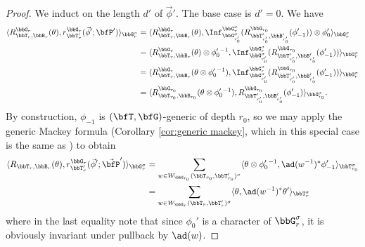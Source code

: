 \begin{proof}
  We induct on the length $d'$ of $\vec \phi'$. The base case is $d' = 0$. We have
  \begin{align*}
    \langle R_{\bbT_r,\bbB_r}^{\bbG_r}(\theta), r_{\bbT_r'}^{\bbG_r}(\vec \phi'; \bfP') \rangle_{\bbG_r^\sigma} 
    &= \langle R_{\bbT_r,\bbB_r}^{\bbG_r}(\theta), \Inf_{\bbG_{r_0'}^\sigma}^{\bbG_r^\sigma}(R_{\bbT_{r_0'}',\bbB_{r_0'}'}^{\bbG_{r_0}}(\phi_{-1}')) \otimes \phi_0' \rangle_{\bbG_r^\sigma} \\
    &= \langle R_{\bbT_r,\bbB_r}^{\bbG_r}(\theta) \otimes \phi_0'{}^{-1}, \Inf_{\bbG_{r_0'}^\sigma}^{\bbG_r^\sigma}(R_{\bbT_{r_0'}',\bbB_{r_0'}'}^{\bbG_{r_0}}(\phi_{-1}')) \rangle_{\bbG_r^\sigma} \\
    &= \langle R_{\bbT_r,\bbB_r}^{\bbG_r}(\theta \otimes \phi_0'{}^{-1}), \Inf_{\bbG_{r_0'}^\sigma}^{\bbG_r^\sigma}(R_{\bbT_{r_0'}',\bbB_{r_0'}'}^{\bbG_{r_0}}(\phi_{-1}')) \rangle_{\bbG_r^\sigma} \\
    &= \langle R_{\bbT_{r_0},\bbB_{r_0}}^{\bbG_{r_0}}(\theta \otimes \phi_0'{}^{-1}), R_{\bbT_{r_0'}',\bbB_{r_0'}'}^{\bbG_{r_0}}(\phi_{-1}') \rangle_{\bbG_{r_0}^\sigma}.
  \end{align*}
  By construction, $\phi_{-1}$ is $(\bfT,\bfG)$-generic of depth $r_0$, so we may apply the generic Mackey formula (Corollary \ref{cor:generic mackey}, which in this special case is the same as \cite[Theorem 1.1]{CI21-RT}) to obtain
  \begin{align*}
    \langle R_{\bbT_r,\bbB_r}(\theta), r_{\bbT_r'}^{\bbG_r}(\vec \phi'; \vec \bfP') \rangle_{\bbG_r^\sigma} 
    &= \sum_{w \in W_{\bbG_{r_0}}(\bbT_{r_0},\bbT_{r_0}')^\sigma} \langle \theta \otimes \phi_0'{}^{-1}, \ad(w^{-1})^* \phi_{-1}' \rangle_{\bbT_{r_0}^\sigma} \\
    &= \sum_{w \in W_{\bbG_{r}}(\bbT_{r},\bbT_{r}')^\sigma} \langle \theta, \ad(w^{-1})^* \theta' \rangle_{\bbT_{r}^\sigma}
  \end{align*}
  where in the last equality note that since $\phi_0'$ is a character of $\bbG_r^\sigma$, it is obviously invariant under pullback by $\ad(w)$.


\end{proof}
